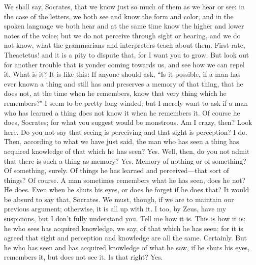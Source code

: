 \documentclass[letterpaper,12pt]{article}
\newcommand{\stephpag}[1]{\marginnote{\small\itshape\fontfamily{ppl}\selectfont #1}}
\begin{document}
\begin{drama}
\theaetetusspeaks
We shall say, Socrates, that we know just so much of them as we hear or see: in the case of the letters, we both see and know the form and color, \stephpag{c} and in the spoken language we both hear and at the same time know the higher and lower notes of the voice; but we do not perceive through sight or hearing, and we do not know, what the grammarians and interpreters teach about them.
\socratesspeaks
First-rate, Theaetetus! and it is a pity to dispute that, for I want you to grow. But look out for another trouble that is yonder coming towards us, and see how we can repel it.
\theaetetusspeaks
What is it?
\socratesspeaks
It is like this: If anyone should ask, ``Is it possible, if a man has ever known a thing and still has \stephpag{d} and preserves a memory of that thing, that he does not, at the time when he remembers, know that very thing which he remembers?" I seem to be pretty long winded; but I merely want to ask if a man who has learned a thing does not know it when he remembers it.
\theaetetusspeaks
Of course he does, Socrates; for what you suggest would be monstrous.
\socratesspeaks
Am I crazy, then? Look here. Do you not say that seeing is perceiving and that sight is perception?
\theaetetusspeaks
I do.
\socratesspeaks
Then, according to what we have just said, the man who has seen a thing has acquired knowledge \stephpag{e} of that which he has seen?
\theaetetusspeaks
Yes.
\socratesspeaks
Well, then, do you not admit that there is such a thing as memory?
\theaetetusspeaks
Yes.
\socratesspeaks
Memory of nothing or of something?
\theaetetusspeaks
Of something, surely.
\socratesspeaks
Of things he has learned and perceived—that sort of things?
\theaetetusspeaks
Of course.
\socratesspeaks
A man sometimes remembers what he has seen, does he not?
\theaetetusspeaks
He does.
\socratesspeaks
Even when he shuts his eyes, or does he forget if he does that?
\theaetetusspeaks
It would be absurd to say that, Socrates. \stephpag{164 a}
\socratesspeaks
We must, though, if we are to maintain our previous argument; otherwise, it is all up with it.
\theaetetusspeaks
I too, by Zeus, have my suspicions, but I don't fully understand you. Tell me how it is.
\socratesspeaks
This is how it is: he who sees has acquired knowledge, we say, of that which he has seen; for it is agreed that sight and perception and knowledge are all the same.
\theaetetusspeaks
Certainly.
\socratesspeaks
But he who has seen and has acquired knowledge of what he saw, if he shuts his eyes, remembers it, but does not see it. Is that right?
\theaetetusspeaks
Yes. \stephpag{b}

\end{drama}
\end{document}
